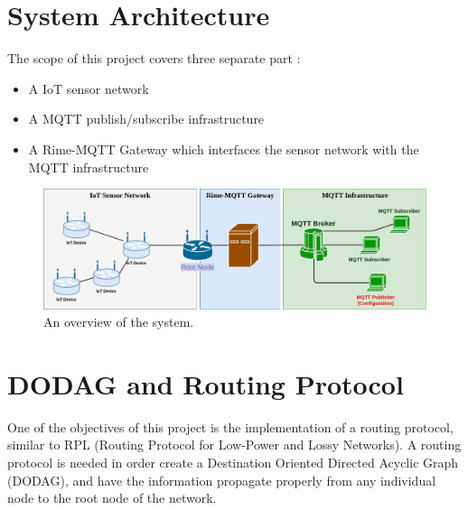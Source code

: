 \documentclass[a4paper,11pt]{article}
\begin{document}

\section{System Architecture}
The scope of this project covers three separate part :
\begin{itemize}
\item{A IoT sensor network}
\item{A MQTT publish/subscribe infrastructure}
\item{A Rime-MQTT Gateway which interfaces the sensor network with the MQTT infrastructure}
\end{itemize}

\begin{figure}
  \includegraphics[width=\linewidth]{img/architecture-2.jpg}
  \caption{An overview of the system.}
  \label{fig:architecture1}
\end{figure}
\section{DODAG and Routing Protocol}
One of the objectives of this project is the implementation of a routing protocol, similar to RPL (Routing Protocol for Low-Power and Lossy Networks). A routing protocol is needed in order create a Destination Oriented Directed Acyclic Graph (DODAG), and have the information propagate properly from any individual node to the root node of the network.\\
\end{document}
